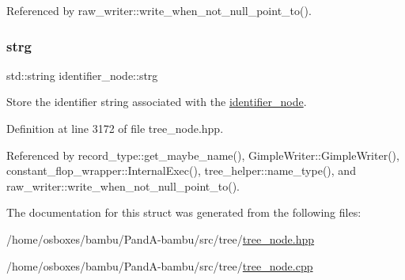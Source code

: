 Referenced by raw\+\_\+writer\+::write\+\_\+when\+\_\+not\+\_\+null\+\_\+point\+\_\+to().

\mbox{\label{structidentifier__node_a23c998343d286f11865313bdd39c4fcb}} 
\subsubsection{\texorpdfstring{strg}{strg}}
{\footnotesize\ttfamily std\+::string identifier\+\_\+node\+::strg}



Store the identifier string associated with the \hyperlink{structidentifier__node}{identifier\+\_\+node}. 



Definition at line 3172 of file tree\+\_\+node.\+hpp.



Referenced by record\+\_\+type\+::get\+\_\+maybe\+\_\+name(), Gimple\+Writer\+::\+Gimple\+Writer(), constant\+\_\+flop\+\_\+wrapper\+::\+Internal\+Exec(), tree\+\_\+helper\+::name\+\_\+type(), and raw\+\_\+writer\+::write\+\_\+when\+\_\+not\+\_\+null\+\_\+point\+\_\+to().



The documentation for this struct was generated from the following files\+:\begin{DoxyCompactItemize}
\item 
/home/osboxes/bambu/\+Pand\+A-\/bambu/src/tree/\hyperlink{tree__node_8hpp}{tree\+\_\+node.\+hpp}\item 
/home/osboxes/bambu/\+Pand\+A-\/bambu/src/tree/\hyperlink{tree__node_8cpp}{tree\+\_\+node.\+cpp}\end{DoxyCompactItemize}

